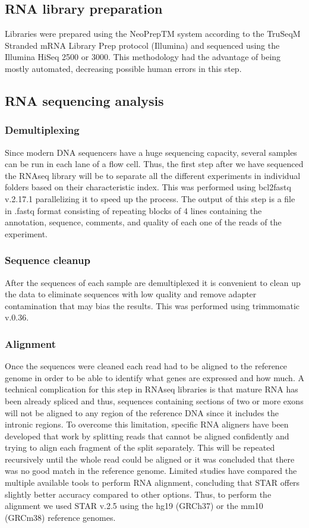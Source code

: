 \subsection{RNA library preparation}
Libraries were prepared using the NeoPrepTM system according to the TruSeqM Stranded mRNA Library Prep protocol (Illumina) and sequenced using the Illumina HiSeq 2500 or 3000. This methodology had the advantage of being mostly automated, decreasing possible human errors in this step.

\subsection{RNA sequencing analysis}
\subsubsection{Demultiplexing}
Since modern DNA sequencers have a huge sequencing capacity, several samples can be run in each lane of a flow cell. Thus, the first step after we have sequenced the RNAseq library will be to separate all the different experiments in individual folders based on their characteristic index. This was performed using bcl2fastq v.2.17.1 parallelizing it to speed up the process. The output of this step is a file in .fastq format consisting of repeating blocks of 4 lines containing the annotation, sequence, comments, and quality of each one of the reads of the experiment.

\subsubsection{Sequence cleanup}
After the sequences of each sample are demultiplexed it is convenient to clean up the data to eliminate sequences with low quality and remove adapter contamination that may bias the results. This was performed using trimmomatic v.0.36.

\subsubsection{Alignment}
Once the sequences were cleaned each read had to be aligned to the reference genome in order to be able to identify what genes are expressed and how much. A technical complication for this step in RNAseq libraries is that mature RNA has been already spliced and thus, sequences containing sections of two or more exons will not be aligned to any region of the reference DNA since it includes the intronic regions. To overcome this limitation, specific RNA aligners have been developed that work by splitting reads that cannot be aligned confidently and trying to align each fragment of the split separately. This will be repeated recursively until the whole read could be aligned or it was concluded that there was no good match in the reference genome.  Limited studies have compared the multiple available tools to perform RNA alignment, concluding that STAR offers slightly better accuracy compared to other options.\cite{Baruzzo2017} Thus, to perform the alignment we used STAR v.2.5 using the hg19 (GRCh37) or the mm10 (GRCm38) reference genomes.


